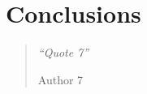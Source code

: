 \chapter{Conclusions}
\label{chapter7}
\thispagestyle{empty}

\begin{quotation}
{\footnotesize
\noindent\emph{``Quote 7''}
\begin{flushright}
Author 7
\end{flushright}
}
\end{quotation}
\vspace{0.5cm}

